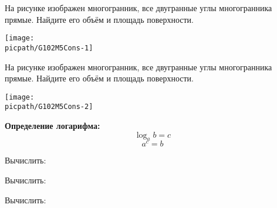 \begin{consultation}
	\begin{listofex}
		\item 
		\begin{minipage}[t]{\bodywidth}
			На рисунке изображен многогранник, все двугранные углы многогранника прямые. Найдите его объём и площадь поверхности.
		\end{minipage}
		\hspace{0.02\linewidth}
		\begin{minipage}[t]{\picwidth}
			\texttt{[image: \\picpath/G102M5Cons-1]}
		\end{minipage}
	\item 
	\begin{minipage}[t]{\bodywidth}
		На рисунке изображен многогранник, все двугранные углы многогранника прямые. Найдите его объём и площадь поверхности.
	\end{minipage}
	\hspace{0.02\linewidth}
	\begin{minipage}[t]{\picwidth}
		\texttt{[image: \\picpath/G102M5Cons-2]}
	\end{minipage}
	\item \textbf{Определение логарифма:}
	\[ \log_ab=c \]
	\[a^c=b\]
	\item Вычислить:
	\begin{enumcols}[itemcolumns=3]
		\item {}
		\item {}
		\item {}
		\item {}
		\item {}
	\end{enumcols}
	\item Вычислить:
	\begin{enumcols}[itemcolumns=3]
		\item {}
		\item {}
		\item {}
	\end{enumcols}
	\item Вычислить:
	\begin{enumcols}[itemcolumns=3]
		\item {}
		\item {}
		\item {}
		\item {}
		\item {}
		\item {}
		\item {}
	\end{enumcols}
	\end{listofex}
\end{consultation}
